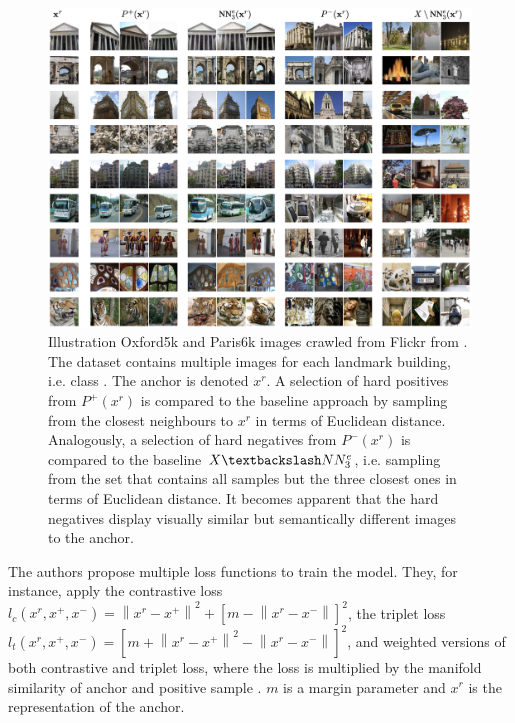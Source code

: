 \begin{figure}[!htb] %
    \centering
    \includegraphics[width=360pt]{images/mining_manifold_examples.png}
    \caption{Illustration Oxford5k and Paris6k images crawled from Flickr from \citet{mining_manifolds_2018}.
    The dataset contains multiple images for each landmark building, i.e. class \citep{manifold_dataset}.
    The anchor is denoted $x^r$.
    A selection of hard positives from $P^+(x^r)$ is compared to the 
    baseline approach by sampling from the closest neighbours to $x^r$ in 
    terms of Euclidean distance.
    Analogously, a selection of hard negatives from $P^-(x^r)$ 
    is compared to the baseline $X \textbackslash NN^e_3$, 
    i.e. sampling from the set that contains all samples but the three closest ones in 
    terms of Euclidean distance.
    It becomes apparent that the hard negatives display visually similar but 
    semantically different images to the anchor. %
    }
    \label{fig:manifold_mining_examples}
\end{figure}

The authors propose multiple loss functions to train the model.
They, for instance, apply the contrastive loss $l_c(x^r, x^+, x^-)= \left\| x^r - x^+ \right\|^2 + \left[ m - \left\| x^r - x^- \right\| \right]^2$, 
the triplet loss $l_t(x^r, x^+, x^-)= \left[ m +  \left\| x^r - x^+ \right\| ^2 - \left\| x^r - x^- \right\| \right]^2$, 
and weighted versions of both contrastive and triplet loss, where the loss is multiplied by the manifold similarity of anchor and positive sample \citep{mining_manifolds_2018}.
$m$ is a margin parameter and $x^r$ is the representation of the anchor.